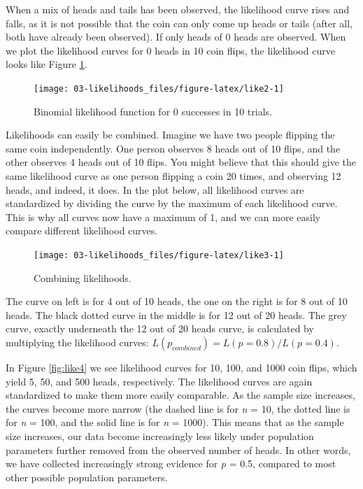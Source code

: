 \documentclass[
  oneside]{krantz}
\begin{document}
When a mix of heads and tails has been observed, the likelihood curve rises and falls, as it is not possible that the coin can only come up heads or tails (after all, both have already been observed). If only heads of 0 heads are observed. When we plot the likelihood curves for 0 heads in 10 coin flips, the likelihood curve looks like Figure \ref{fig:like2}.



\begin{figure}

{\centering \texttt{[image: 03-likelihoods\_files/figure-latex/like2-1]} 

}

\caption{Binomial likelihood function for 0 successes in 10 trials.}\label{fig:like2}
\end{figure}

Likelihoods can easily be combined. Imagine we have two people flipping the same coin independently. One person observes 8 heads out of 10 flips, and the other observes 4 heads out of 10 flips. You might believe that this should give the same likelihood curve as one person flipping a coin 20 times, and observing 12 heads, and indeed, it does. In the plot below, all likelihood curves are standardized by dividing the curve by the maximum of each likelihood curve. This is why all curves now have a maximum of 1, and we can more easily compare different likelihood curves.



\begin{figure}

{\centering \texttt{[image: 03-likelihoods\_files/figure-latex/like3-1]} 

}

\caption{Combining likelihoods.}\label{fig:like3}
\end{figure}

The curve on left is for 4 out of 10 heads, the one on the right is for 8 out of 10 heads. The black dotted curve in the middle is for 12 out of 20 heads. The grey curve, exactly underneath the 12 out of 20 heads curve, is calculated by multiplying the likelihood curves: \(L(p_{combined}) = L(p = 0.8) / L(p = 0.4)\).

In Figure \ref{fig:like4} we see likelihood curves for 10, 100, and 1000 coin flips, which yield 5, 50, and 500 heads, respectively. The likelihood curves are again standardized to make them more easily comparable. As the sample size increases, the curves become more narrow (the dashed line is for \emph{n} = 10, the dotted line is for \emph{n} = 100, and the solid line is for \emph{n} = 1000). This means that as the sample size increases, our data become increasingly less likely under population parameters further removed from the observed number of heads. In other words, we have collected increasingly strong evidence for \emph{p} = 0.5, compared to most other possible population parameters.
\end{document}
